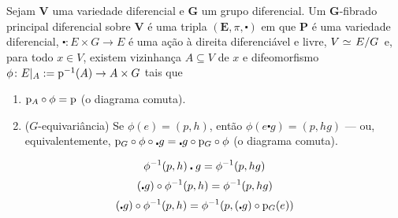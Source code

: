 \begin{definition}
Sejam $\bm V$ uma variedade diferencial e $\bm G$ um grupo diferencial. Um $\bm G$-fibrado principal diferencial sobre $\bm V$ é uma tripla $(\bm E,\pi,\centerdot)$ em que $\bm P$ é uma variedade diferencial, $\centerdot\colon E \times G \to E$ é uma ação à direita diferenciável e livre, $V \simeq \quo{E}{G}$ e, para todo $x \in V$, existem vizinhança $A \subseteq V$ de $x$ e difeomorfismo $\phi\colon E|_A := \mathrm{p}^{-1}(A) \to A \times G$ tais que
	\begin{enumerate}
	\item $\mathrm{p}_A \circ \phi = \mathrm{p}$ (o diagrama comuta).
\begin{figure}
\centering
{}
\end{figure}

	\item ($G$-equivariância) Se $\phi(e) = (p,h)$, então $\phi(e \centerdot g) = (p,hg)$ --- ou, equivalentemente, $\mathrm{p}_G \circ \phi \circ \centerdot g = \centerdot g \circ \mathrm{p}_G \circ \phi$ (o diagrama comuta).
\begin{figure}
\centering
{}
\end{figure}
	\end{enumerate}
\end{definition}

	\begin{equation*}
	\phi^{-1} (p,h) \centerdot g = \phi^{-1} (p,hg)
	\end{equation*}
	\begin{equation*}
	(\centerdot g) \circ \phi^{-1} (p,h) = \phi^{-1} (p,hg)
	\end{equation*}
	\begin{equation*}
	(\centerdot g) \circ \phi^{-1} (p,h) = \phi^{-1} (p,(\centerdot g) \circ \mathrm{p}_G(e))
	\end{equation*}

